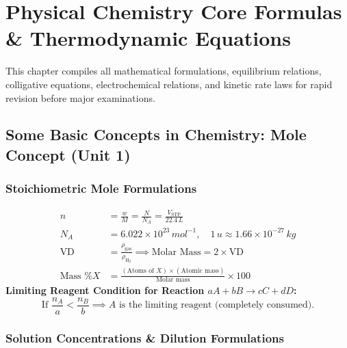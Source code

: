 \documentclass[10pt,twoside,openright]{book}
\begin{document}
\chapter{Physical Chemistry Core Formulas \& Thermodynamic Equations}

This chapter compiles all mathematical formulations, equilibrium relations, colligative equations, electrochemical relations, and kinetic rate laws for rapid revision before major examinations.

\section{Some Basic Concepts in Chemistry: Mole Concept (Unit 1)}

\subsection{Stoichiometric Mole Formulations}

\begin{formulabox}
\begin{align}
  n &= \frac{w}{M} = \frac{N}{N_A} = \frac{V_{\text{STP}}}{22.4\,\si{L}} \\
  N_A &= 6.022\times 10^{23}\,\si{mol^{-1}}, \quad 1\,\si{u} \approx 1.66\times 10^{-27}\,\si{kg} \\
  \text{VD} &= \frac{\rho_{\text{gas}}}{\rho_{\mathrm{H_2}}} \implies \text{Molar Mass} = 2 \times \text{VD} \\
  \text{Mass \% } X &= \frac{(\text{Atoms of } X)\times(\text{Atomic mass})}{\text{Molar mass}} \times 100
\end{align}
\textbf{Limiting Reagent Condition for Reaction $aA + bB \to cC + dD$:}
\begin{equation}
  \text{If } \frac{n_A}{a} < \frac{n_B}{b} \implies A \text{ is the limiting reagent (completely consumed).}
\end{equation}
\end{formulabox}

\subsection{Solution Concentrations \& Dilution Formulations}
\end{document}
